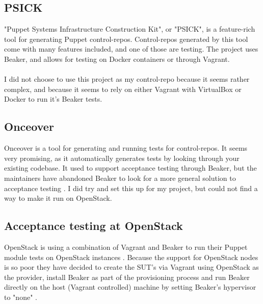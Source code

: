 \subsection{PSICK}

"Puppet Systems Infrastructure Construction Kit"\cite{psickgithub}, or "PSICK", is a feature-rich tool for generating Puppet control-repos. Control-repos generated by this tool come with many features included, and one of those are testing. The project uses Beaker, and allows for testing on Docker containers or through Vagrant.
\\
\\
I did not choose to use this project as my control-repo because it seems rather complex, and because it seems to rely on either Vagrant with VirtualBox or Docker to run it's Beaker tests.

\subsection{Onceover}

Onceover\cite{onceovergithub} is a tool for generating and running tests for control-repos. It seems very promising, as it automatically generates tests by looking through your existing codebase. It used to support acceptance testing through Beaker, but the maintainers have abandoned Beaker to look for a more general solution to acceptance testing \cite{onceoverbeakerpr}. I did try and set this up for my project, but could not find a way to make it run on OpenStack.

\subsection{Acceptance testing at OpenStack}

OpenStack is using a combination of Vagrant and Beaker to run their Puppet module tests on OpenStack instances \cite{puppetmodulefunctionaltestingbeakerinsidevagrant}\cite{openstackpuppetmodulefunctionaltestingproposal}\cite{openstackci}. Because the support for OpenStack nodes is so poor they have decided to create the SUT's via Vagrant using OpenStack as the provider, install Beaker as part of the provisioning process and run Beaker directly on the host (Vagrant controlled) machine by setting Beaker's hypervisor to "none" \cite{puppetmodulefunctionaltestingbeakerinsidevagrantnodeexample}.



